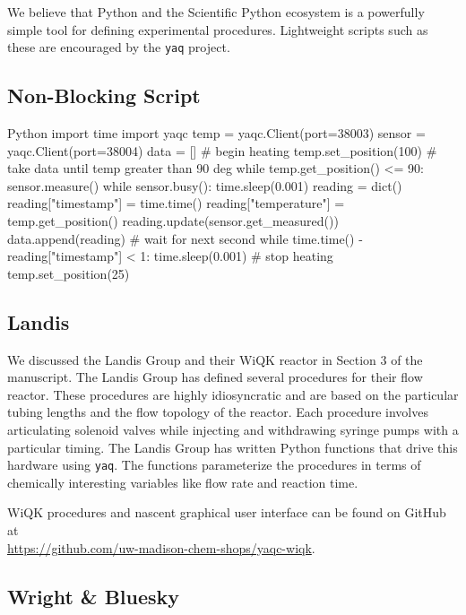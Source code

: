 \documentclass[11pt, full]{article}
\newcommand\yaq{\texttt{yaq}}
\begin{document}
We believe that Python and the Scientific Python ecosystem is a powerfully simple tool for defining experimental procedures.
Lightweight scripts such as these are encouraged by the \yaq{} project.

\clearpage

\subsection{Non-Blocking Script}

\begin{codefragment}{Python}
import time
import yaqc
temp = yaqc.Client(port=38003)
sensor = yaqc.Client(port=38004)
data = []
# begin heating
temp.set_position(100)
# take data until temp greater than 90 deg
while temp.get_position() <= 90:
    sensor.measure()
    while sensor.busy():
        time.sleep(0.001)
    reading = dict()
    reading["timestamp"] = time.time()
    reading["temperature"] = temp.get_position()
    reading.update(sensor.get_measured())
    data.append(reading)
    # wait for next second
    while time.time() - reading["timestamp"] < 1:
        time.sleep(0.001)
# stop heating
temp.set_position(25)
\end{codefragment}

\clearpage

\subsection{Landis}

We discussed the Landis Group and their WiQK reactor in Section 3 of the manuscript.
The Landis Group has defined several procedures for their flow reactor.
These procedures are highly idiosyncratic and are based on the particular tubing lengths and the flow topology of the reactor.
Each procedure involves articulating solenoid valves while injecting and withdrawing syringe pumps with a particular timing.
The Landis Group has written Python functions that drive this hardware using \yaq{}.
The functions parameterize the procedures in terms of chemically interesting variables like flow rate
and reaction time.

WiQK procedures and nascent graphical user interface can be found on GitHub at \\ \url{https://github.com/uw-madison-chem-shops/yaqc-wiqk}.

\subsection{Wright \& Bluesky}
\end{document}

